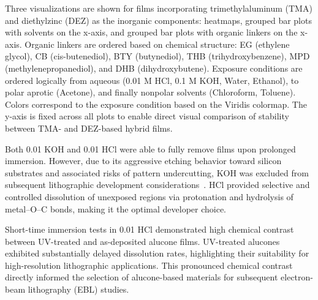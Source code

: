 Three visualizations are shown for films incorporating trimethylaluminum (TMA) and diethylzinc (DEZ) as the inorganic components: heatmaps, grouped bar plots with solvents on the x-axis, and grouped bar plots with organic linkers on the x-axis. Organic linkers are ordered based on chemical structure: EG (ethylene glycol), CB (cis-butenediol), BTY (butynediol), THB (trihydroxybenzene), MPD (methylenepropanediol), and DHB (dihydroxybutene). Exposure conditions are ordered logically from aqueous (0.01 M HCl, 0.1 M KOH, Water, Ethanol), to polar aprotic (Acetone), and finally nonpolar solvents (Chloroform, Toluene). Colors correspond to the exposure condition based on the Viridis colormap. The y-axis is fixed across all plots to enable direct visual comparison of stability between TMA- and DEZ-based hybrid films.

Both \SI{0.01}{\molar} KOH and \SI{0.01}{\molar} HCl were able to fully remove films upon prolonged immersion. However, due to its aggressive etching behavior toward silicon substrates and associated risks of pattern undercutting, KOH was excluded from subsequent lithographic development considerations~\cite{Horie2010}. HCl provided selective and controlled dissolution of unexposed regions via protonation and hydrolysis of metal--O--C bonds, making it the optimal developer choice.

Short-time immersion tests in \SI{0.01}{\molar} HCl demonstrated high chemical contrast between UV-treated and as-deposited alucone films. UV-treated alucones exhibited substantially delayed dissolution rates, highlighting their suitability for high-resolution lithographic applications. This pronounced chemical contrast directly informed the selection of alucone-based materials for subsequent electron-beam lithography (EBL) studies.





